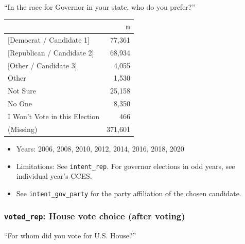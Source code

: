 \documentclass[10pt,article,oneside]{memoir}
\theoremstyle{definition}
\begin{document}
``In the race for Governor in your state, who do you prefer?''

\begin{table}[H]
\centering
\begin{tabular}[t]{lr}
\toprule
 & n\\
\midrule
{}{[Democrat / Candidate 1]} & 77,361\\
{}{[Republican / Candidate 2]} & 68,934\\
{}{[Other / Candidate 3]} & 4,055\\
Other & 1,530\\
Not Sure & 25,158\\
No One & 8,350\\
I Won't Vote in this Election & 466\\
(Missing) & 371,601\\
\bottomrule
\end{tabular}
\end{table}

\begin{itemize}
\tightlist
\item
  Years: 2006, 2008, 2010, 2012, 2014, 2016, 2018, 2020
\item
  Limitations: See \texttt{intent\_rep}. For governor elections in odd
  years, see individual year's CCES.
\item
  See \texttt{intent\_gov\_party} for the party affiliation of the
  chosen candidate.
\end{itemize}

\hypertarget{voted_rep-house-vote-choice-after-voting}{%
\subsubsection{\texorpdfstring{\texttt{voted\_rep}: House vote choice
(after
voting)}{voted\_rep: House vote choice (after voting)}}\label{voted_rep-house-vote-choice-after-voting}}

``For whom did you vote for U.S. House?''
\end{document}
